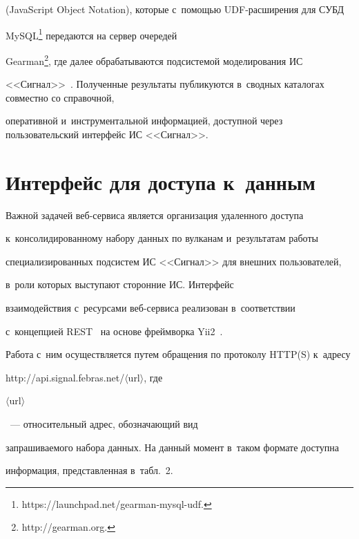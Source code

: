 (JavaScript Object Notation), которые с~помощью UDF-рас\-ши\-ре\-ния для СУБД 


MySQL\footnote{{\sf https://launchpad.net/gearman-mysql-udf.}} передаются на сервер очередей 


Gearman\footnote{{\sf http://gearman.org.}}, где далее обрабатываются подсистемой моделирования ИС 


<<Сигнал>>~\cite{8-kor}. Полученные результаты пуб\-ли\-ку\-ют\-ся в~сводных каталогах совместно со справочной, 


оперативной и~инструментальной информацией, доступной через пользовательский интерфейс ИС <<Сигнал>>.


     


\section{Интерфейс для доступа к~данным }





     Важной задачей веб-сервиса является организация удаленного доступа 


к~консолидированному набору данных по вулканам и~результатам работы 


специализированных подсистем ИС <<Сигнал>> для внешних пользователей, 


в~роли которых выступают сторонние ИС. Интерфейс 


взаимодействия с~ресурсами веб-сер\-ви\-са реализован в~соответствии 


с~концепцией REST~\cite{9-kor} на основе фреймворка Yii2~\cite{10-kor}. 


Работа с~ним осуществляется путем обращения по протоколу HTTP(S) к~адресу 


{\sf http://api.signal.febras.net/$\langle$url$\rangle$}, где {\sf 


$\langle$url$\rangle$}~--- относительный адрес, обозначающий вид 


запрашиваемого набора данных. На данный момент в~таком формате доступна 


информация, представленная в~табл.~2.


     


